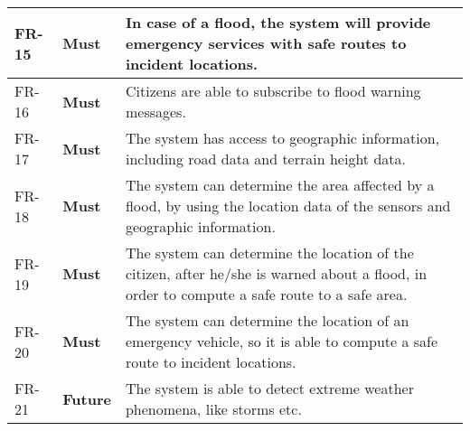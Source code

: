 \begin{longtable}{L{0.1\textwidth} L{0.1\textwidth} L{0.8\textwidth}}
	\midrule {} \label{fr:15} FR-15 & 
      \textbf{Must} &
     In case of a flood, the system will provide emergency services with safe routes to incident locations. \\
    
    \midrule {} \label{fr:16} FR-16 & 
      \textbf{Must} &
     Citizens are able to subscribe to flood warning messages. \\
    
    \midrule {} \label{fr:17} FR-17 & 
      \textbf{Must} &
     The system has access to geographic information, including road data and terrain height data. \\
    
    \midrule {} \label{fr:18} FR-18 & 
      \textbf{Must} &
     The system can determine the area affected by a flood, by using the location data of the sensors and geographic information. \\
    
    \midrule {} \label{fr:19} FR-19 & 
      \textbf{Must} &
     The system can determine the location of the citizen, after he/she is warned about a flood, in order to compute a safe route to a safe area. \\
    
    \midrule {} \label{fr:20} FR-20 & 
      \textbf{Must} &
     The system can determine the location of an emergency vehicle, so it is able to compute a safe route to incident locations. \\

    \midrule {} \label{fr:21} FR-21 & 
      \textbf{Future} &
     The system is able to detect extreme weather phenomena, like storms etc. \\
    
    \bottomrule
\end{longtable}